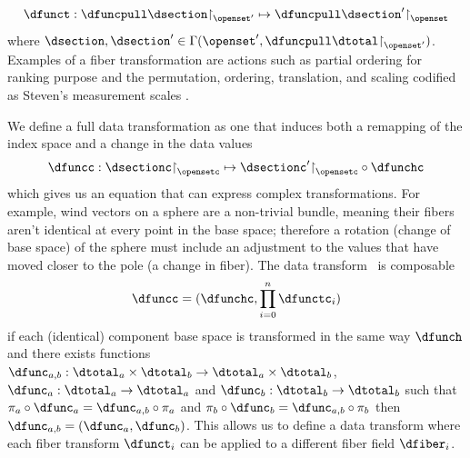 \documentclass[10pt,journal,compsoc]{IEEEtran}
\renewcommand{\restriction}{\mathord{\upharpoonright}} %
\theoremstyle{definition}
\theoremstyle{remark}
\begin{document}
\begin{equation}
  \label{eq:atct:morphism:fiber}
  \dfunct: \dfuncpull \dsection \restriction_{\openset^{\prime}} \mapsto \dfuncpull \dsection^{\prime} \restriction_{\openset}
\end{equation}
where $\dsection, \dsection^{\prime} \in \Gamma(\openset^{\prime}, \dfuncpull\dtotal\restriction_{\openset^{\prime}})$. Examples of a fiber transformation are actions such as partial ordering for ranking purpose \cite{bruggemannRankingPrioritizationMultiindicator2011} and the permutation, ordering, translation, and scaling codified as Steven's measurement scales \cite{stevensTheoryScalesMeasurement1946}. 

We define a full data transformation as one that induces both a remapping of the index space and a change in the data values
\begin{equation}
  \label{eq:atct:morphism:all}
  \dfuncc: \dsectionc\restriction_{\opensetc} \mapsto \dsectionc^{\prime}\restriction_{\opensetc} \circ \dfunchc
\end{equation}
which gives us an equation that can express complex transformations. For example, wind vectors on a sphere are a non-trivial bundle, meaning their fibers aren't identical at every point in the base space; therefore a rotation (change of base space) of the sphere must include an adjustment to the values that have moved closer to the pole (a change in fiber).  
The data transform \dfunc\ is composable 
\begin{equation}
  \dfuncc = (\dfunchc, \prod\limits_{i=0}^{n}\dfunctc_i)
\end{equation}
if each (identical) component base space is transformed in the same way $\dfunch$ and there exists functions $\dfunc_{a,b}: \dtotal_a \times \dtotal_b \rightarrow \dtotal_a \times \dtotal_b$, $\dfunc_{a}: \dtotal_a \rightarrow \dtotal_a$ and $\dfunc_{b}: \dtotal_b \rightarrow \dtotal_b$ such that $\pi_a \circ \dfunc_a = \dfunc_{a,b} \circ \pi_a$ and $\pi_b \circ \dfunc_b = \dfunc_{a,b} \circ \pi_b$ then $\dfunc_{a,b} = (\dfunc_a, \dfunc_b)$. This allows us to define a data transform where each fiber transform $\dfunct_{i}$ can be applied to a different fiber field $\dfiber_i$. 
\end{document}
